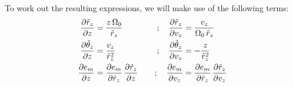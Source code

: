 To work out the resulting expressions, we will make use of the following terms:
\begin{alignat}{3}
    \frac{\partial \tilde{r}_z}{\partial z} &= \frac{z\,\Omega_0}{\tilde{r}_z} \quad &; \quad
        \frac{\partial \tilde{r}_z}{\partial v_z} &= \frac{v_z}{\Omega_0 \, \tilde{r}_z} \\
    \frac{\partial \tilde{\theta}_z}{\partial z} &= \frac{v_z}{\tilde{r}_z^2} \quad &; \quad
        \frac{\partial \tilde{\theta}_z}{\partial v_z} &= -\frac{z}{\tilde{r}_z^2} \\
    \frac{\partial e_m}{\partial z} &=
        \frac{\partial e_m}{\partial \tilde{r}_z} \, \frac{\partial \tilde{r}_z}{\partial z}
        \quad &; \quad
        \frac{\partial e_m}{\partial v_z} &=
        \frac{\partial e_m}{\partial \tilde{r}_z} \, \frac{\partial \tilde{r}_z}{\partial v_z}
\end{alignat}

